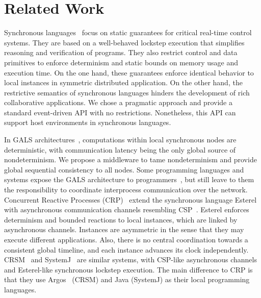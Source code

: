 \documentclass[sigplan,screen]{acmart}
\begin{document}
\section{Related Work}
\label{sec.related}

Synchronous languages~\cite{langs} focus on static guarantees for critical
real-time control systems.
They are based on a well-behaved lockstep execution that simplifies reasoning
and verification of programs.
They also restrict control and data primitives to enforce determinism and
static bounds on memory usage and execution time.
On the one hand, these guarantees enforce identical behavior to local instances
in symmetric distributed application.
On the other hand, the restrictive semantics of synchronous languages hinders
the development of rich collaborative applications.
We chose a pragmatic approach and provide a standard event-driven API with no
restrictions.
Nonetheless, this API can support host environments in synchronous languages.

In GALS architectures~\cite{gals.taxonomy}, computations within local
synchronous nodes are deterministic, with communication latency being the only
global source of nondeterminism.
We propose a middleware to tame nondeterminism and provide global sequential
consistency to all nodes.
%
Some programming languages and systems expose the GALS architecture to
programmers~\cite{gals.crp,gals.crsm,gals.systemj}, but still leave to them the
responsibility to coordinate interprocess communication over the network.
%
Concurrent Reactive Processes (CRP)~\cite{gals.crp} extend the synchronous
language Esterel~\cite{esterel} with asynchronous communication
channels resembling CSP~\cite{csp}.
%
Esterel enforces determinism and bounded reactions to local instances, which
are linked by asynchronous channels.
Instances are asymmetric in the sense that they may execute different
applications.
Also, there is no central coordination towards a consistent global timeline,
and each instance advances its clock independently.
%
CRSM~\cite{gals.crsm} and SystemJ~\cite{gals.systemj} are similar systems, with
CSP-like asynchronous channels and Esterel-like synchronous lockstep execution.
The main difference to CRP is that they use Argos~\cite{argos} (CRSM) and Java
(SystemJ) as their local programming languages.
\end{document}
